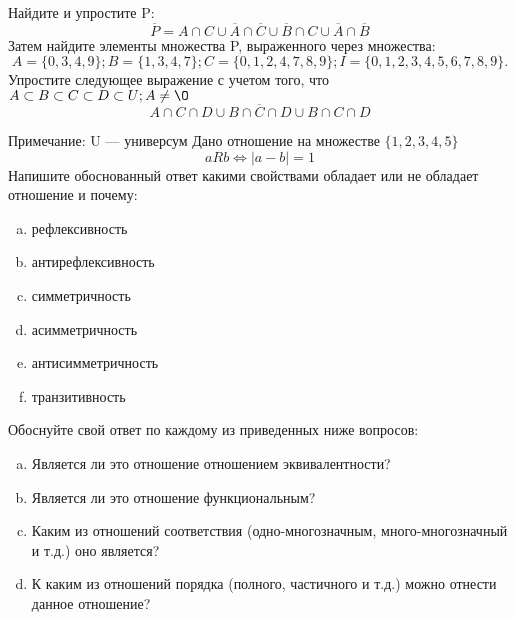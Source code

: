 \documentclass[10pt]{exam}
\begin{document}
\begin{questions}
\question
Найдите и упростите P:
\begin{equation*}
\overline{P} = A \cap C \cup \overline{A} \cap \overline{C} \cup \overline{B} \cap C \cup \overline{A} \cap \overline{B}
\end{equation*}
Затем найдите элементы множества P, выраженного через множества:
\begin{equation*}
A = \{0, 3, 4, 9\}; 
B = \{1, 3, 4, 7\};
C = \{0, 1, 2, 4, 7, 8, 9\};
I = \{0, 1, 2, 3, 4, 5, 6, 7, 8, 9\}.
\end{equation*}\question
Упростите следующее выражение с учетом того, что $A\subset B \subset C \subset D \subset U; A \neq \O$
\begin{equation*}
A \cap C  \cap D \cup B \cap \overline{C} \cap D \cup B \cap C \cap D
\end{equation*}

Примечание: U — универсум\question
Дано отношение на множестве $\{1, 2, 3, 4, 5\}$ 
\begin{equation*}
aRb \iff |a-b| = 1
\end{equation*}
Напишите обоснованный ответ какими свойствами обладает или не обладает отношение и почему:   
\begin{enumerate} [a)]\setcounter{enumi}{0}
\item рефлексивность
\item антирефлексивность
\item симметричность
\item асимметричность
\item антисимметричность
\item транзитивность
\end{enumerate}

Обоснуйте свой ответ по каждому из приведенных ниже вопросов:
\begin{enumerate} [a)]\setcounter{enumi}{0}
    \item Является ли это отношение отношением эквивалентности?
    \item Является ли это отношение функциональным?
    \item Каким из отношений соответствия (одно-многозначным, много-многозначный и т.д.) оно является?
    \item К каким из отношений порядка (полного, частичного и т.д.) можно отнести данное отношение?
\end{enumerate}


\end{questions}
\end{document}
